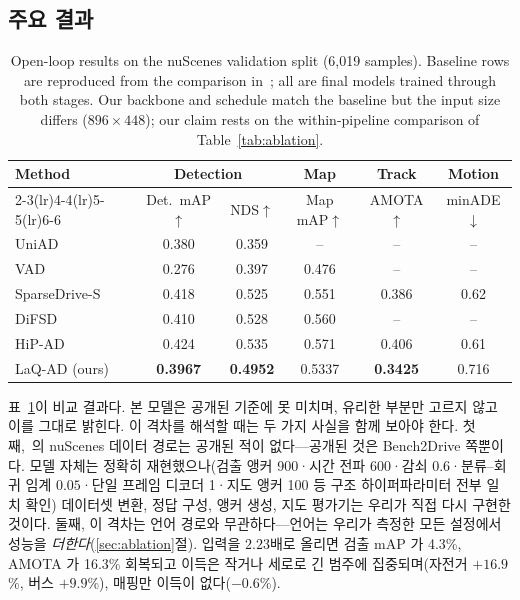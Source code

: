 \documentclass[conference]{IEEEtran}
\newcommand{\measured}[1]{#1}
\begin{document}
\subsection{주요 결과}

\begin{table}[t]
\caption{Open-loop results on the nuScenes validation split (\measured{6{,}019}
samples). Baseline rows are reproduced from the comparison in~\cite{hipad2025};
all are final models trained through both stages. Our backbone and schedule match the
baseline but the input size differs ($896\!\times\!448$); our claim rests on
the within-pipeline comparison of Table~\ref{tab:ablation}.}
\label{tab:main}
\centering
\small
\begin{tabular}{lccccc}
\toprule
\multirow{2}{*}{Method} & \multicolumn{2}{c}{Detection} & Map & Track & Motion \\
\cmidrule(lr){2-3}\cmidrule(lr){4-4}\cmidrule(lr){5-5}\cmidrule(lr){6-6}
 & Det.\ mAP$\uparrow$ & NDS$\uparrow$ & Map mAP$\uparrow$ & AMOTA$\uparrow$ & minADE$\downarrow$ \\
\midrule
UniAD~\cite{hu2023uniad}                & 0.380 & 0.359 & --    & --    & -- \\
VAD~\cite{jiang2023vad}                 & 0.276 & 0.397 & 0.476 & --    & -- \\
SparseDrive-S~\cite{sun2024sparsedrive} & 0.418 & 0.525 & 0.551 & 0.386 & 0.62 \\
DiFSD~\cite{su2024difsd}                & 0.410 & 0.528 & 0.560 & --    & -- \\
HiP-AD~\cite{hipad2025}                 & 0.424 & 0.535 & 0.571 & 0.406 & 0.61 \\
\midrule
LaQ-AD (ours)
  & \measured{\textbf{0.3967}} & \measured{\textbf{0.4952}} & \measured{0.5337}
  & \measured{\textbf{0.3425}} & \measured{0.716} \\
\bottomrule
\end{tabular}
\end{table}

표~\ref{tab:main}이 비교 결과다. 본 모델은 공개된 기준에 못 미치며, 유리한 부분만 고르지
않고 이를 그대로 밝힌다. 이 격차를 해석할 때는 두 가지 사실을 함께 보아야 한다.
첫째,~\cite{hipad2025}의 nuScenes 데이터 경로는 공개된 적이 없다---공개된 것은
Bench2Drive 쪽뿐이다. 모델 자체는 정확히 재현했으나(검출 앵커 900·시간 전파 600·감쇠
$0.6$·분류--회귀 임계 $0.05$·단일 프레임 디코더 1·지도 앵커 100 등 구조 하이퍼파라미터
전부 일치 확인) 데이터셋 변환, 정답 구성, 앵커 생성, 지도 평가기는 우리가 직접 다시 구현한 것이다.
둘째, 이 격차는 언어 경로와 무관하다---언어는 우리가 측정한 모든 설정에서 성능을
\emph{더한다}(\ref{sec:ablation}절). 입력을 $2.23$배로 올리면 검출 mAP 가
\measured{4.3}\%, AMOTA 가 \measured{16.3}\% 회복되고 이득은 작거나 세로로 긴 범주에
집중되며(자전거 \measured{$+16.9$}\%, 버스 \measured{$+9.9$}\%), 매핑만 이득이
없다(\measured{$-0.6$}\%).
\end{document}
